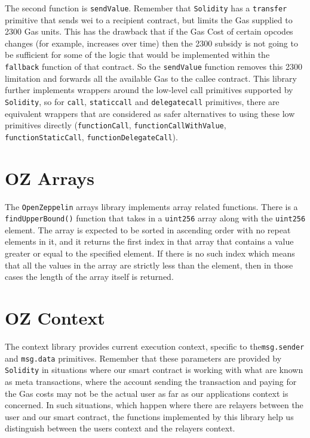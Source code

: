 The second function is \verb|sendValue|. Remember that \verb|Solidity| has a \verb|transfer| primitive that sends wei to a recipient contract, but limits the Gas supplied to 2300 Gas units. This has the drawback that if the Gas Cost of certain opcodes changes (for example, increases over time) then the 2300 subsidy is not going to be sufficient for some of the logic that would be implemented within the \verb|fallback| function of that contract. So the \verb|sendValue| function removes this 2300 limitation and forwards all the available Gas to the callee contract. This library further implements wrappers around the low-level call primitives supported by \verb|Solidity|, so for \verb|call|, \verb|staticcall| and \verb|delegatecall| primitives, there are equivalent wrappers that are considered as safer alternatives to using these low primitives directly (\verb|functionCall|, \verb|functionCallWithValue|, \verb|functionStaticCall|, \verb|functionDelegateCall|).

\section{OZ Arrays}
The \verb|OpenZeppelin| arrays library implements array related functions. There is a \verb|findUpperBound()| function that takes in a \verb|uint256| array along with the \verb|uint256| element. The array is expected to be sorted in ascending order with no repeat elements in it, and it returns the first index in that array that contains a value greater or equal to the specified element. If there is no such index which means that all the values in the array are strictly less than the element, then in those cases the length of the array itself is returned.

\section{OZ Context}
The context library provides current execution context, specific to the\linebreak\verb|msg.sender| and \verb|msg.data| primitives. Remember that these parameters are provided by \verb|Solidity| in situations where our smart contract is working with what are known as meta transactions, where the account sending the transaction and paying for the Gas costs may not be the actual user as far as our applications context is concerned. In such situations, which happen where there are relayers between the user and our smart contract, the functions implemented by this library help us distinguish between the users context and the relayers context.

